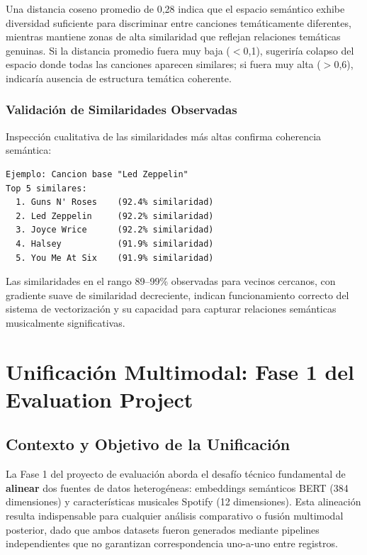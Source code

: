 Una distancia coseno promedio de 0,28 indica que el espacio semántico exhibe diversidad suficiente para discriminar entre canciones temáticamente diferentes, mientras mantiene zonas de alta similaridad que reflejan relaciones temáticas genuinas. Si la distancia promedio fuera muy baja ($<$0,1), sugeriría colapso del espacio donde todas las canciones aparecen similares; si fuera muy alta ($>$0,6), indicaría ausencia de estructura temática coherente.

\subsubsection{Validación de Similaridades Observadas}

Inspección cualitativa de las similaridades más altas confirma coherencia semántica:

\begin{lstlisting}[caption={Ejemplo de similaridades semánticas observadas}, label={lst:similaridades}]
Ejemplo: Cancion base "Led Zeppelin"
Top 5 similares:
  1. Guns N' Roses    (92.4% similaridad)
  2. Led Zeppelin     (92.2% similaridad)
  3. Joyce Wrice      (92.2% similaridad)
  4. Halsey           (91.9% similaridad)
  5. You Me At Six    (91.9% similaridad)
\end{lstlisting}

Las similaridades en el rango 89--99\% observadas para vecinos cercanos, con gradiente suave de similaridad decreciente, indican funcionamiento correcto del sistema de vectorización y su capacidad para capturar relaciones semánticas musicalmente significativas.

\section{Unificación Multimodal: Fase 1 del Evaluation Project}
\label{sec:unificacion-multimodal}

\subsection{Contexto y Objetivo de la Unificación}
\label{subsec:contexto-unificacion}

La Fase 1 del proyecto de evaluación aborda el desafío técnico fundamental de \textbf{alinear} dos fuentes de datos heterogéneas: embeddings semánticos BERT (384 dimensiones) y características musicales Spotify (12 dimensiones). Esta alineación resulta indispensable para cualquier análisis comparativo o fusión multimodal posterior, dado que ambos datasets fueron generados mediante pipelines independientes que no garantizan correspondencia uno-a-uno entre registros.

